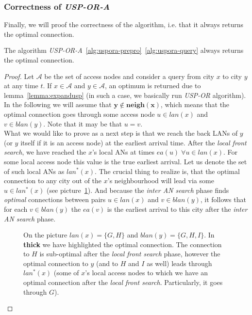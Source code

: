 	\subsubsection{Correctness of \textit{USP-OR-A}}
	
		\noindent Finally, we will proof the correctness of the algorithm, i.e. that it always returns the optimal connection.
		
		\begin{theorem}
			The algorithm \textit{USP-OR-A}~\ref{alg:uspora-prepro}~\ref{alg:uspora-query} always returns the optimal connection.
		\end{theorem}
		
		\begin{proof}
			Let $\mathcal{A}$ be the set of access nodes and consider a query from city $x$ to city $y$ at any time $t$. If $x \in \mathcal{A}$ and $y \in \mathcal{A}$, an optimum is returned due to lemma~\ref{lemma:expandusp} (in such a case, we basically run \textit{USP-OR} algorithm). \\
			
			\noindent In the following we will assume that $\bm{y \not \in neigh(x)}$, which means that the optimal connection goes through some access node $u \in lan(x)$ and $v \in blan(y)$. Note that it may be that $u = v$. \\
			
			\noindent What we would like to prove as a next step is that we reach the back LANs of $y$ (or $y$ itself if it is an access node) at the earliest arrival time. After the \textit{local front search}, we have reached the $x$'s local ANs at times $ea(u) \; \forall u \in lan(x)$. For some local access node this value is the true earliest arrival. Let us denote the set of such local ANs as $lan^{*}(x)$. The crucial thing to realize is, that the optimal connection to any city out of the $x$'s neighbourhood will lead via some $u \in lan^{*}(x)$ (see picture~\ref{fig:usporaproof2}). And because the \textit{inter AN search} phase finds \textit{optimal} connections between pairs $u \in lan(x)$ and $v \in blan(y)$, it follows that for each $v \in blan(y)$ the $ea(v)$ is the earliest arrival to this city after the \textit{inter AN search} phase.
			
			\begin{figure}[h!]
				\begin{center}
				\end{center}
				\caption{\label{fig:usporaproof2} On the picture $lan(x) = \{G, H\}$ and $blan(y) = \{G, H, I\}$. In \textbf{thick} we have highlighted the optimal connection. The connection to $H$ is sub-optimal after the \textit{local front search} phase, however the optimal connection to $y$ (and to $H$ and $I$ as well) leads through $lan^{*}(x)$ (some of $x$'s local access nodes to which we have an optimal connection after the \textit{local front search}. Particularly, it goes through $G$).}
			\end{figure}
			

\end{proof}
